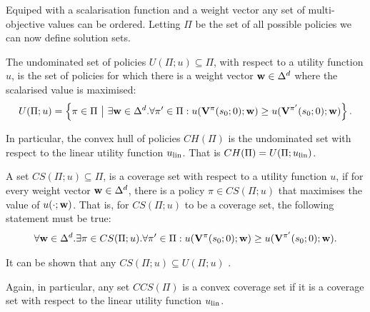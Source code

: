     Equiped with a scalarisation function and a weight vector any set of multi-objective values can be ordered. Letting $\Pi$ be the set of all possible policies we can now define solution sets.

    \begin{defn}
        \label{def:undominated_set}
        \label{def:convex_hull}
        The \textnormal{undominated set} of policies $U(\Pi;u)\subseteq\Pi$, with respect to a utility function $u$,  is the set of policies for which there is a weight vector $\mathbf{w}\in\Delta^d$ where the scalarised value is maximised: 
        \begin{align}
            U(\Pi;u) = \left\{\pi\in\Pi\ \big|\ \exists \mathbf{w}\in\Delta^d. \forall \pi'\in\Pi: u(\mathbf{V}^{\pi}(s_0;0);\mathbf{w}) \geq u(\mathbf{V}^{\pi'}(s_0;0);\mathbf{w}) \right\}.
        \end{align}

        In particular, the \textnormal{convex hull} of policies $CH(\Pi)$ is the undominated set with respect to the linear utility function $u_{\textnormal{lin}}$. That is $CH(\Pi)=U(\Pi;u_{\textnormal{lin}})$.
    \end{defn}    



    \begin{defn}
        \label{def:coverage_set}
        \label{def:convex_coverage_set}
        A set $CS(\Pi;u)\subseteq\Pi$, is a \textnormal{coverage set} with respect to a utility function $u$, if for every weight vector $\mathbf{w}\in\Delta^d$, there is a policy $\pi\in CS(\Pi;u)$ that maximises the value of $u(\cdot;\mathbf{w})$. That is, for $CS(\Pi;u)$ to be a coverage set, the following statement must be true:
        \begin{align}
            \forall \mathbf{w}\in\Delta^d. \exists \pi\in CS(\Pi;u). \forall \pi'\in\Pi: u(\mathbf{V}^{\pi}(s_0;0);\mathbf{w}) \geq u(\mathbf{V}^{\pi'}(s_0;0);\mathbf{w}).
        \end{align}

        It can be shown that any $CS(\Pi;u)\subseteq U(\Pi;u)$ .

        Again, in particular, any set $CCS(\Pi)$ is a \textnormal{convex coverage set} if it is a coverage set with respect to the linear utility function $u_{\textnormal{lin}}$. 
    \end{defn}


